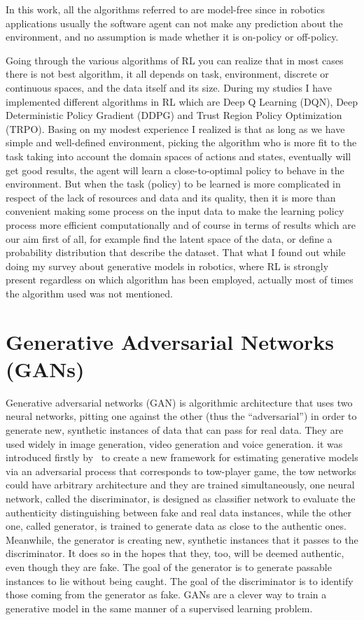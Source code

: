 In this work, all the algorithms referred to are model-free since in robotics applications usually the software agent can not make any prediction about the environment, and no assumption is made whether it is on-policy or off-policy.

\vspace{0.3cm}
Going through the various algorithms of RL you can realize that in most cases there is not best algorithm, it all depends on task, environment, discrete or continuous spaces, and the data itself and its size. During my studies I have implemented different algorithms in RL which are Deep Q Learning (DQN), Deep Deterministic Policy Gradient (DDPG) and Trust Region Policy Optimization (TRPO). Basing on my modest experience I realized is that as long as we have simple and well-defined environment, picking the algorithm who is more fit to the task taking into account the domain spaces of actions and states, eventually will get good results, the agent will learn a close-to-optimal policy to behave in the environment. But when the task (policy) to be learned is more complicated in respect of the lack of resources and data and its quality, then it is more than convenient making some process on the input data to make the learning policy process more efficient computationally and of course in terms of results which are our aim first of all, for example find the latent space of the data, or define a probability distribution that describe the dataset. That what I found out while doing my survey about generative models in robotics, where RL is strongly present regardless on which algorithm has been employed, actually most of times the algorithm used was not mentioned. 

\section{Generative Adversarial Networks (GANs)}

Generative adversarial networks (GAN) is algorithmic architecture that uses two neural networks, pitting one against the other (thus the “adversarial”) in order to generate new, synthetic instances of data that can pass for real data. They are used widely in image generation, video generation and voice generation. it was introduced firstly by~\cite{goodfellow2014generative} to create a new framework for estimating generative models via an adversarial process that corresponds to tow-player game,
the tow networks could have arbitrary architecture and they are trained simultaneously, one neural network, called the discriminator, is designed as classifier network to evaluate the authenticity  distinguishing between fake and real data instances, while the other one, called generator, is trained to generate data as close to the authentic ones. Meanwhile, the generator is creating new, synthetic instances that it passes to the discriminator. It does so in the hopes that they, too, will be deemed authentic, even though they are fake. The goal of the generator is to generate passable instances to lie without being caught. The goal of the discriminator is to identify those coming from the generator as fake. GANs are a clever way to train a generative model in the same manner of a supervised learning problem.

